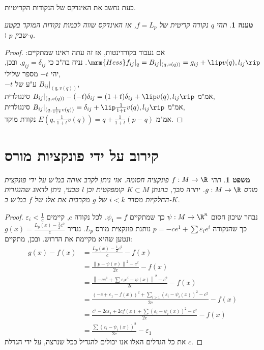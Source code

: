 \documentclass{article}
\newtheorem*{claim*}{טענה}
\newtheorem*{theorem*}{משפט}
\theoremstyle{definition}
\newcommand{\norm}[1]{\left\lVert#1\right\rVert}
\begin{document}
	כעת נחשב את האינדקס של הנקודות הקריטיות.
	\begin{claim*}
		תהי
		\(q\)
		נקודה קריטית של
		\(f=L_p\),
		אז האינדקס שווה לכמות נקודות המוקד בקטע שבין \(p\) ו-\(q\).
	\end{claim*}
	\begin{proof}
		אם נעבוד בקורדינטות, אז זה עתה ראינו שמתקיים:
		\(
			\mrm{Hess}f_{ij}|_q
			= B_{ij}|_{(q,v(q))}
			= g_{ij} + \lip v(q),l_{ij} \rip
		\).
		נניח בה"כ כי
		\(g_{ij}=\delta_{ij}\).
		ובכן, יהי
		\(-t\)
		מספר שלילי,
		\\
		\(-t\)
		ע"ע של
		\(B_{ij}|_{(q,v(q))}\),
		\\
		אמ"מ
		\(B_{ij}|_{(q,v(q))}-(-t)\delta_{ij} = (1+t)\delta_{ij} + \lip v(q),l_{ij} \rip\)
		סינגולרית,
		\\
		אמ"מ
		\(B_{ij}|_{(q,\frac{1}{1+t}v(q))}=\delta_{ij} + \lip \frac{1}{1+t}v(q),l_{ij} \rip\)
		סינגולרית,
		\\
		אמ"מ
		\(E\left(q,\frac{1}{1+t}v(q)\right) = q + \frac{1}{1+t} (p-q)\)
		נקודת מוקד.
	\end{proof}




	\section{קירוב על ידי פונקציות מורס}
	\begin{theorem*}
		תהי
		\(f: M\to \R\)
		פונקציה חסומה.
		אזי ניתן לקרב אותה במ"ש על ידי פונקצית מורס
		\(g: M \to \R\).
		יתרה מכך, בהנתן
		\(K\subset M\)
		קומפקטית וכן
		\(l\)
		טבעי,
		ניתן לדאוג שהנגזרות החלקיות מסדר
		\(i<k\)
		של \(g\) מקרבות את אלו של \(f\) במ"ש ב-\(K\).
	\end{theorem*}
	\begin{proof}
		נבחר שיכון חסום
		\(\psi: M \to \R^n\)
		כך שמתקיים
		\(\psi_1=f\).
		לכל נקודה
		\(c\),
		קיימים
		\(\varepsilon_i<\frac{1}{c}\)
		כך שהנקודה
		\(p=-c e^1+\sum \varepsilon_i e^i\)
		נותנת פונקצית מורס
		\(L_p\).
		נגדיר
		\(g(x)=\frac{L_p(x)-\frac{1}{2}c^2}{c}\)
		ונטען שהיא מקיימת את הדרוש.
		ובכן, מתקיים:
		\begin{equation*}\begin{split}
			g(x)-f(x)
			&= \frac{L_p(x)-\frac{1}{2}c^2}{c}-f(x)
			\\&= \frac{\norm{p-\psi(x)}^2-c^2}{2c}-f(x)
			\\&= \frac{\norm{-c e^1+\sum \varepsilon_i e^i-\psi(x)}^2-c^2}{2c}-f(x)
			\\&= \frac{
				\left(-c+\varepsilon_1 - f\left(x\right)\right)^2
				+\sum_{i>1} \left(\varepsilon_i - \psi_i\left(x\right)\right)^2
				-c^2
			}{2c}-f(x)
			\\&= \frac{
				c^2-2c \varepsilon_1+2c f\left(x\right)
				+\sum \left(\varepsilon_i - \psi_i\left(x\right)\right)^2
				-c^2
			}{2c}-f(x)
			\\&= \frac{
				\sum \left(\varepsilon_i - \psi_i\left(x\right)\right)^2
			}{2c}-\varepsilon_1
		\end{split}\end{equation*}
		את כל הגדלים האלו אנו יכולים להגדיל ככל שנרצה, על ידי הגדלת \(c\).
	\end{proof}
	
\end{document}
